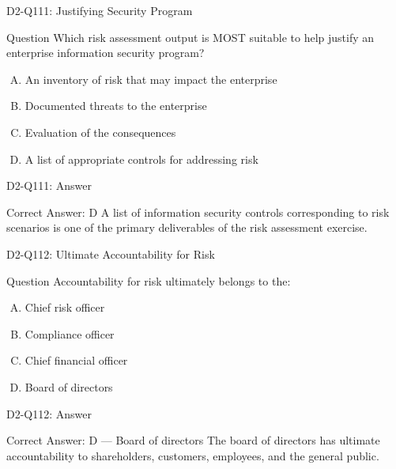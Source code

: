 \documentclass{beamer}
\begin{document}
	\begin{frame}{D2-Q111: Justifying Security Program}
		\begin{block}{Question}
			Which risk assessment output is MOST suitable to help justify an enterprise information security program?
		\end{block}
		\begin{enumerate}[(A)]
			\item An inventory of risk that may impact the enterprise
			\item Documented threats to the enterprise
			\item Evaluation of the consequences
			\item A list of appropriate controls for addressing risk
		\end{enumerate}
	\end{frame}
	\begin{frame}{D2-Q111: Answer}
		\begin{block}{Correct Answer: D}
			A list of information security controls corresponding to risk scenarios is one of the primary deliverables of the risk assessment exercise.
		\end{block}
	\end{frame}
	
	\begin{frame}{D2-Q112: Ultimate Accountability for Risk}
		\begin{block}{Question}
			Accountability for risk ultimately belongs to the:
		\end{block}
		\begin{enumerate}[(A)]
			\item Chief risk officer
			\item Compliance officer
			\item Chief financial officer
			\item Board of directors
		\end{enumerate}
	\end{frame}
	\begin{frame}{D2-Q112: Answer}
		\begin{block}{Correct Answer: D --- Board of directors}
			The board of directors has ultimate accountability to shareholders, customers, employees, and the general public.
		\end{block}
	\end{frame}
	
\end{document}
